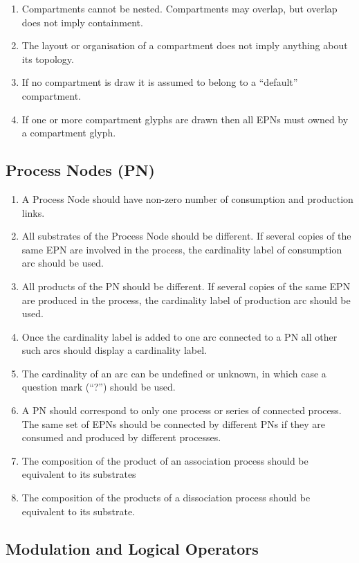 \begin{enumerate}
\item Compartments cannot be nested. Compartments may overlap, but overlap does not imply containment.
\item The layout or organisation of a compartment does not imply anything about its topology.
\item If no compartment is draw it is assumed to belong to a “default” compartment.
\item If one or more compartment glyphs are drawn then all EPNs must owned by a compartment glyph.
\end{enumerate}

\subsection{Process Nodes (PN)}

\begin{enumerate}
\item A Process Node should have non-zero number of consumption and production links.
\item All substrates of the Process Node should be different. If several copies of the same EPN are involved in the process, the cardinality label of consumption arc should be used.
\item All products of the PN should be different. If several copies of the same EPN are produced in the process, the cardinality label of production arc should be used.
\item Once the cardinality label is added to one arc connected to a PN all other such arcs should display a cardinality label.
\item The cardinality of an arc can be undefined or unknown, in which case a question mark (``?'') should be used.
\item A PN should correspond to only one process or series of connected process. The same set of EPNs should be connected by different PNs if they are consumed and produced by different processes.
\item The composition of the product of an association process should be equivalent to its substrates
\item The composition of the products of a dissociation process should be equivalent to its substrate.
\end{enumerate}

\subsection{Modulation and Logical Operators}

